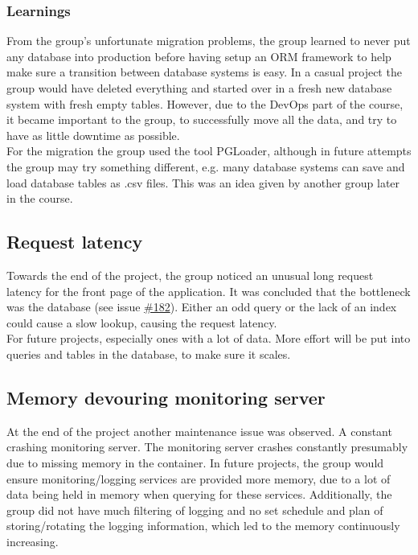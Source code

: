 \subsubsection{Learnings}
From the group's unfortunate migration problems, the group learned to never put any database into production before having setup an ORM framework to help make sure a transition between database systems is easy. In a casual project the group would have deleted everything and started over in a fresh new database system with fresh empty tables. However, due to the DevOps part of the course, it became important to the group, to successfully move all the data, and try to have as little downtime as possible. \\

For the migration the group used the tool PGLoader\cite{pgloader}, although in future attempts the group may try something different, e.g. many database systems can save and load database tables as .csv files. This was an idea given by another group later in the course.

\subsection{Request latency}
Towards the end of the project, the group noticed an unusual long request latency for the front page of the application. It was concluded that the bottleneck was the database (see issue \href{https://github.com/DevelOpsITU/MiniTwit/issues/182}{\#182}). Either an odd query or the lack of an index could cause a slow lookup, causing the request latency.\\
For future projects, especially ones with a lot of data. More effort will be put into queries and tables in the database, to make sure it scales.

\subsection{Memory devouring monitoring server}
 At the end of the project another maintenance issue was observed. A constant crashing monitoring server. The monitoring server crashes constantly presumably due to missing memory in the container.  %
In future projects, the group would ensure monitoring/logging services are provided more memory, due to a lot of data being held in memory when querying for these services. Additionally, the group did not have much filtering of logging and no set schedule and plan of storing/rotating the logging information, which led to the memory continuously increasing. 

